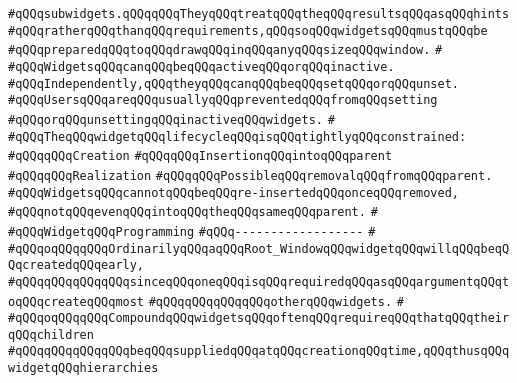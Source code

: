 \verb|#qQQqsubwidgets.qQQqqQQqTheyqQQqtreatqQQqtheqQQqresultsqQQqasqQQqhints|\newline
\verb|#qQQqratherqQQqthanqQQqrequirements,qQQqsoqQQqwidgetsqQQqmustqQQqbe|\newline
\verb|#qQQqpreparedqQQqtoqQQqdrawqQQqinqQQqanyqQQqsizeqQQqwindow.|\newline
\verb|#|\newline
\verb|#qQQqWidgetsqQQqcanqQQqbeqQQqactiveqQQqorqQQqinactive.|\newline
\verb|#qQQqIndependently,qQQqtheyqQQqcanqQQqbeqQQqsetqQQqorqQQqunset.|\newline
\verb|#qQQqUsersqQQqareqQQqusuallyqQQqpreventedqQQqfromqQQqsetting|\newline
\verb|#qQQqorqQQqunsettingqQQqinactiveqQQqwidgets.|\newline
\verb|#|\newline
\verb|#qQQqTheqQQqwidgetqQQqlifecycleqQQqisqQQqtightlyqQQqconstrained:|\newline
\verb|#qQQqqQQqCreation|\newline
\verb|#qQQqqQQqInsertionqQQqintoqQQqparent|\newline
\verb|#qQQqqQQqRealization|\newline
\verb|#qQQqqQQqPossibleqQQqremovalqQQqfromqQQqparent.|\newline
\verb|#qQQqWidgetsqQQqcannotqQQqbeqQQqre-insertedqQQqonceqQQqremoved,|\newline
\verb|#qQQqnotqQQqevenqQQqintoqQQqtheqQQqsameqQQqparent.|\newline
\verb|#|\newline
\verb|#qQQqWidgetqQQqProgramming|\newline
\verb|#qQQq------------------|\newline
\verb|#|\newline
\verb|#qQQqoqQQqqQQqOrdinarilyqQQqaqQQqRoot_WindowqQQqwidgetqQQqwillqQQqbeqQQqcreatedqQQqearly,|\newline
\verb|#qQQqqQQqqQQqqQQqsinceqQQqoneqQQqisqQQqrequiredqQQqasqQQqargumentqQQqtoqQQqcreateqQQqmost|\newline
\verb|#qQQqqQQqqQQqqQQqotherqQQqwidgets.|\newline
\verb|#|\newline
\verb|#qQQqoqQQqqQQqCompoundqQQqwidgetsqQQqoftenqQQqrequireqQQqthatqQQqtheirqQQqchildren|\newline
\verb|#qQQqqQQqqQQqqQQqbeqQQqsuppliedqQQqatqQQqcreationqQQqtime,qQQqthusqQQqwidgetqQQqhierarchies|\newline
